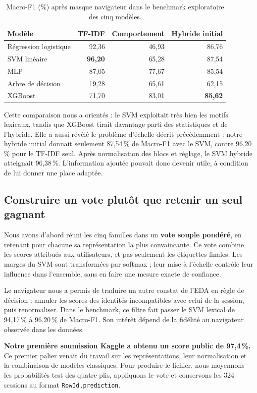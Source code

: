 \documentclass{rapportECL}
\begin{document}
\begin{table}[!htbp]
\centering\small
\begin{tabular}{lrrr}
\hline
Modèle & TF-IDF & Comportement & Hybride initial \\
\hline
Régression logistique & 92,36 & 46,93 & 86,76 \\
SVM linéaire & \textbf{96,20} & 65,28 & 87,54 \\
MLP & 87,05 & 77,67 & 85,54 \\
Arbre de décision & 19,28 & 65,61 & 62,15 \\
XGBoost & 71,70 & 83,01 & \textbf{85,62} \\
\hline
\end{tabular}
\caption{Macro-F1 (\%) après masque navigateur dans le benchmark exploratoire des cinq modèles.}
\end{table}

Cette comparaison nous a orientés : le SVM exploitait très bien les motifs lexicaux, tandis que XGBoost tirait davantage parti des statistiques et de l'hybride. Elle a aussi révélé le problème d'échelle décrit précédemment : notre hybride initial donnait seulement 87,54\,\% de Macro-F1 avec le SVM, contre 96,20\,\% pour le TF-IDF seul. Après normalisation des blocs et réglage, le SVM hybride atteignait 96,38\,\%. L'information ajoutée pouvait donc devenir utile, à condition de lui donner une place adaptée.

\subsection{Construire un vote plutôt que retenir un seul gagnant}

Nous avons d'abord réuni les cinq familles dans un \textbf{vote souple pondéré}, en retenant pour chacune sa représentation la plus convaincante. Ce vote combine les scores attribués aux utilisateurs, et pas seulement les étiquettes finales. Les marges du SVM sont transformées par softmax ; leur mise à l'échelle contrôle leur influence dans l'ensemble, sans en faire une mesure exacte de confiance.

Le navigateur nous a permis de traduire un autre constat de l'EDA en règle de décision : annuler les scores des identités incompatibles avec celui de la session, puis renormaliser. Dans le benchmark, ce filtre fait passer le SVM lexical de 94,17\,\% à 96,20\,\% de Macro-F1. Son intérêt dépend de la fidélité au navigateur observée dans les données.

\textbf{Notre première soumission Kaggle a obtenu un score public de 97,4\,\%.} Ce premier palier venait du travail sur les représentations, leur normalisation et la combinaison de modèles classiques. Pour produire le fichier, nous moyennons les probabilités test des quatre plis, appliquons le vote et conservons les 324 sessions au format \texttt{RowId,prediction}.
\end{document}
